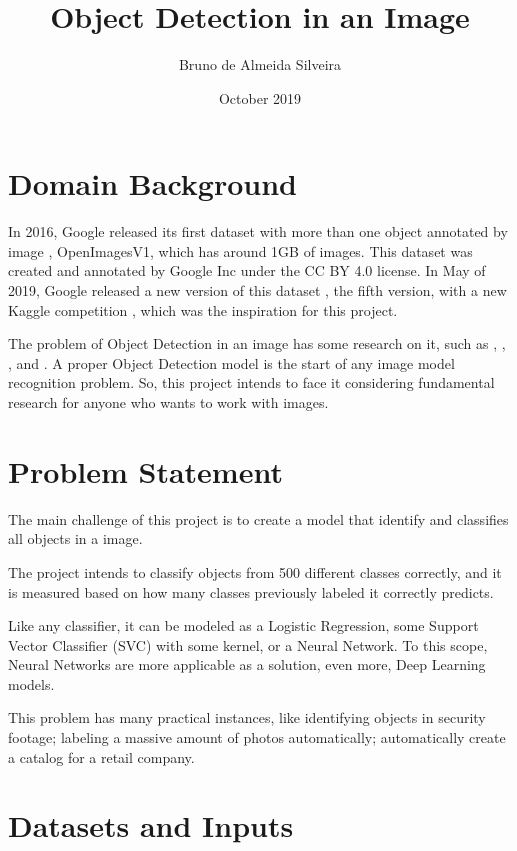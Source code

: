 \documentclass[11pt]{article}
\title{\textbf{Object Detection in an Image}}
\author{Bruno de Almeida Silveira}
\date{October 2019}
\begin{document}
\maketitle

\section{Domain Background}

In 2016, Google released its first dataset with more than one object annotated by image \cite{google:1}, OpenImagesV1, which has around 1GB of images. This dataset was created and annotated by Google Inc under the CC BY 4.0 license.  In May of 2019, Google released a new version of this dataset \cite{google:2}, the fifth version, with a new Kaggle competition \cite{kaggle}, which was the inspiration for this project.

The problem of Object Detection in an image has some research on it, such as \cite{intro:1}, \cite{intro:2}, \cite{intro:3}, and \cite{intro:4}. A proper Object Detection model is the start of any image model recognition problem. So, this project intends to face it considering fundamental research for anyone who wants to work with images.


\section{Problem Statement}

The main challenge of this project is to create a model that identify and classifies all objects in a image.

The project intends to classify objects from 500 different classes correctly, and it is measured based on how many classes previously labeled it correctly predicts.

Like any classifier, it can be modeled as a Logistic Regression, some Support Vector Classifier (SVC) with some kernel, or a Neural Network. To this scope, Neural Networks are more applicable as a solution, even more, Deep Learning models.

This problem has many practical instances, like identifying objects in security footage; labeling a massive amount of photos automatically; automatically create a catalog for a retail company.

\section{Datasets and Inputs}
\end{document}
